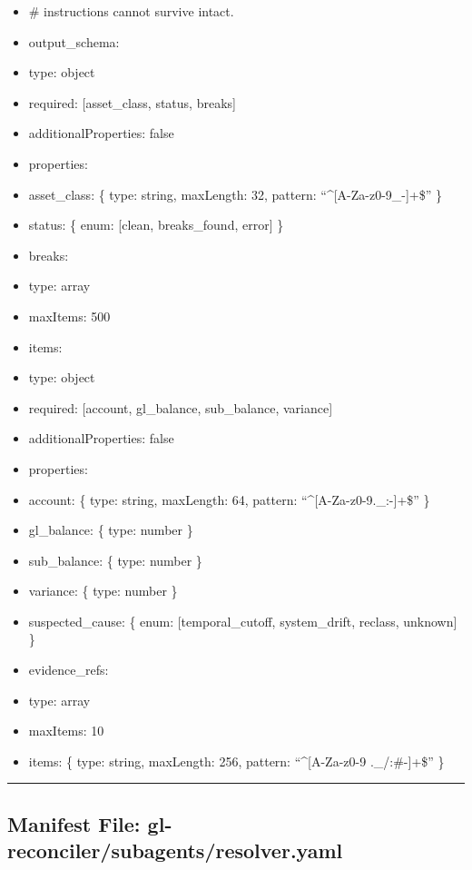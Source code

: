 \documentclass[11pt]{article}
\begin{document}
\begin{itemize}[leftmargin=*,itemsep=2pt,topsep=2pt]
\item {} \# instructions cannot survive intact.
\item {} output\_\allowbreak{}schema:
\item {} type: object
\item {} required: [asset\_\allowbreak{}class, status, breaks]
\item {} additionalProperties: false
\item {} properties:
\item {} asset\_\allowbreak{}class: \{ type: string, maxLength: 32, pattern: ``\textasciicircum{}[A-Za-z0-9\_\allowbreak{}-]+\$'' \}
\item {} status: \{ enum: [clean, breaks\_\allowbreak{}found, error] \}
\item {} breaks:
\item {} type: array
\item {} maxItems: 500
\item {} items:
\item {} type: object
\item {} required: [account, gl\_\allowbreak{}balance, sub\_\allowbreak{}balance, variance]
\item {} additionalProperties: false
\item {} properties:
\item {} account: \{ type: string, maxLength: 64, pattern: ``\textasciicircum{}[A-Za-z0-9.\_\allowbreak{}:-]+\$'' \}
\item {} gl\_\allowbreak{}balance: \{ type: number \}
\item {} sub\_\allowbreak{}balance: \{ type: number \}
\item {} variance: \{ type: number \}
\item {} suspected\_\allowbreak{}cause: \{ enum: [temporal\_\allowbreak{}cutoff, system\_\allowbreak{}drift, reclass, unknown] \}
\item {} evidence\_\allowbreak{}refs:
\item {} type: array
\item {} maxItems: 10
\item {} items: \{ type: string, maxLength: 256, pattern: ``\textasciicircum{}[A-Za-z0-9 .\_\allowbreak{}/:\#-]+\$'' \}
\end{itemize}

\vspace{0.8em}\hrule\vspace{0.8em}

\subsection{Manifest File: gl-reconciler/subagents/resolver.yaml}\label{file:gl-reconciler-subagents-resolver-yaml}
\end{document}
